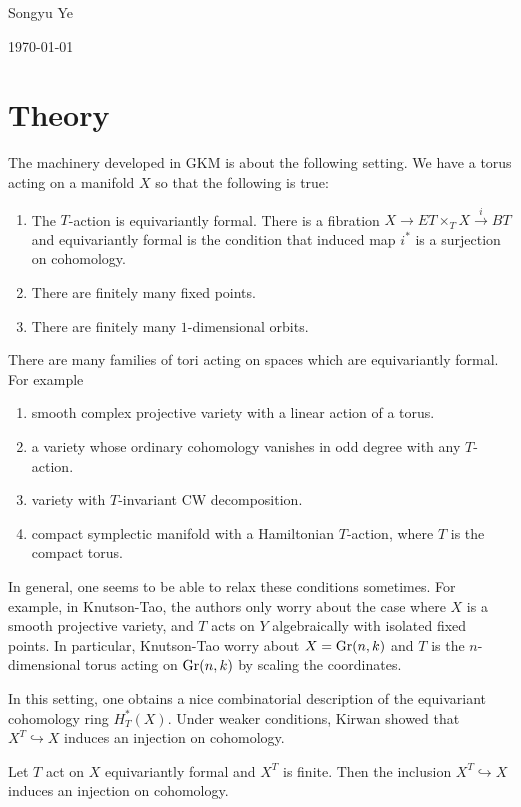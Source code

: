 \documentclass[12pt]{article}
\begin{document}
Songyu Ye

\today
\section{Theory}

The machinery developed in GKM is about the following setting. We have a torus acting 
on a manifold $X$ so that the following is true: \begin{enumerate}
    \item The $T$-action is equivariantly formal. There is a fibration $X \to ET\times_T X \xrightarrow{i} BT$
    and equivariantly formal is the condition that induced map $i^*$ is a surjection on cohomology.
    \item There are finitely many fixed points.
    \item There are finitely many $1$-dimensional orbits.
\end{enumerate}

There are many families of tori acting on spaces which are equivariantly formal. For example \begin{enumerate}
    \item smooth complex projective variety with a linear action of a torus.
    \item a variety whose ordinary cohomology vanishes in odd degree with any $T$-action.
    \item variety with $T$-invariant CW decomposition.
    \item compact symplectic manifold with a Hamiltonian $T$-action, where $T$ is the compact torus.
\end{enumerate}

In general, one seems to be able to relax these conditions sometimes. For example, in Knutson-Tao,
the authors only worry about the case where $X$ is a smooth projective variety, and $T$ acts on $Y$ algebraically with isolated fixed points.
In particular, Knutson-Tao worry about $X = \operatorname{Gr}(n,k)$ and $T$ is the $n$-dimensional torus acting on $\operatorname{Gr}(n,k)$ by scaling the coordinates.

\hfill



In this setting, one obtains a nice combinatorial description of the equivariant cohomology ring $H_T^*(X)$.
Under weaker conditions, Kirwan showed that $X^T\hookrightarrow X$ induces an injection on cohomology.

\begin{theorem}
    Let $T$ act on $X$ equivariantly formal and $X^T$ is finite. Then the inclusion $X^T\hookrightarrow X$ induces an injection on cohomology.
\end{theorem}
\end{document}
